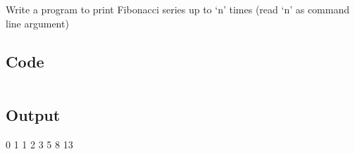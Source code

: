 \documentclass[../main.tex]{subfiles}
\begin{document}
Write a program to print Fibonacci series up to ‘n’ times (read ‘n’ as command line argument)

\subsection{Code}
\inputminted[frame=lines, breaklines, breakanywhere, numberblanklines=false]{java}{./programs/prog1/Fibo.java}

\subsection{Output}
0 1 1 2 3 5 8 13
\end{document}
